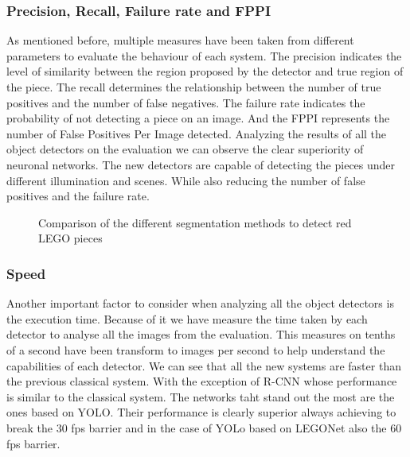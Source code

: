 {\subsubsection*{Precision, Recall, Failure rate and FPPI}
As mentioned before, multiple measures have been taken from different parameters to evaluate the behaviour of each system. The precision indicates the level of similarity between the region proposed by the detector and true region of the piece. The recall determines the relationship between the number of true positives and the number of false negatives. The failure rate indicates the probability of not detecting a piece on an image. And the FPPI represents the number of False Positives Per Image detected. Analyzing the results of all the object detectors on the evaluation we can observe the clear superiority of neuronal networks. The new detectors are capable of detecting the pieces under different illumination and scenes. While also reducing the number of false positives and the failure rate. 

\begin{figure}[ht]  %
\vspace{-10pt}
  \hfill	
\caption{Comparison of the different segmentation methods to detect red LEGO pieces}
\label{fig:abs2}
\end{figure}

\subsubsection*{Speed}
Another important factor to consider when analyzing all the object detectors is the execution time. Because of it we have measure the time taken by each detector to analyse all the images from the evaluation. This measures on tenths of a second have been transform to images per second to help understand the capabilities of each detector. We can see that all the new systems are faster than the previous classical system. With the exception of R-CNN whose performance is similar to the classical system. The networks taht stand out the most are the ones based on YOLO. Their performance is clearly superior always achieving to break the 30 fps barrier and in the case of YOLo based on LEGONet also the 60 fps barrier.

}
